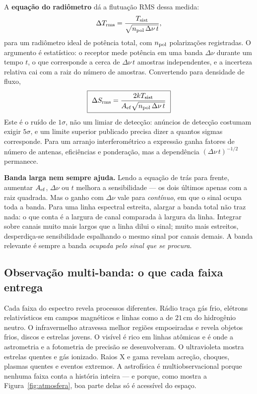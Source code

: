 \documentclass[11pt,a4paper]{article}
\begin{document}
A \textbf{equação do radiômetro} dá a flutuação RMS dessa medida:
\[
\Delta T_{\rm rms}=\frac{T_{\rm sist}}{\sqrt{n_{\rm pol}\,\Delta\nu\,t}},
\]
para um radiômetro ideal de potência total, com $n_{\rm pol}$ polarizações registradas. O argumento é estatístico:
o receptor mede potência em uma banda $\Delta\nu$ durante um tempo $t$, o que corresponde a cerca de
$\Delta\nu\,t$ amostras independentes, e a incerteza relativa cai com a raiz do número de amostras. Convertendo
para densidade de fluxo,
\[
\boxed{\ \Delta S_{\rm rms}=\frac{2kT_{\rm sist}}{A_{\rm ef}\sqrt{n_{\rm pol}\,\Delta\nu\,t}}\ }
\]
Este é o ruído de $1\sigma$, não um limiar de detecção: anúncios de detecção costumam exigir $5\sigma$, e um
limite superior publicado precisa dizer a quantos sigmas corresponde. Para um arranjo interferométrico a
expressão ganha fatores de número de antenas, eficiências e ponderação, mas a dependência $(\Delta\nu\,t)^{-1/2}$
permanece.

\begin{noticebox}
\textbf{Banda larga nem sempre ajuda.} Lendo a equação de trás para frente, aumentar $A_{\rm ef}$, $\Delta\nu$ ou
$t$ melhora a sensibilidade --- os dois últimos apenas com a raiz quadrada. Mas o ganho com $\Delta\nu$ vale para
\emph{contínuo}, em que o sinal ocupa toda a banda. Para uma linha espectral estreita, alargar a banda total não
traz nada: o que conta é a largura de canal comparada à largura da linha. Integrar sobre canais muito mais largos
que a linha dilui o sinal; muito mais estreitos, desperdiça-se sensibilidade espalhando o mesmo sinal por canais
demais. A banda relevante é sempre a banda \emph{ocupada pelo sinal que se procura}.
\end{noticebox}

\subsection*{Observação multi-banda: o que cada faixa entrega}

Cada faixa do espectro revela processos diferentes. Rádio traça gás frio, elétrons relativísticos em campos
magnéticos e linhas como a de $21\,\mathrm{cm}$ do hidrogênio neutro. O infravermelho atravessa melhor regiões
empoeiradas e revela objetos frios, discos e estrelas jovens. O visível é rico em linhas atômicas e é onde a
astrometria e a fotometria de precisão se desenvolveram. O ultravioleta mostra estrelas quentes e gás ionizado.
Raios X e gama revelam acreção, choques, plasmas quentes e eventos extremos. A astrofísica é multiobservacional
porque nenhuma faixa conta a história inteira --- e porque, como mostra a Figura~\ref{fig:atmosfera}, boa parte
delas só é acessível do espaço.
\end{document}
